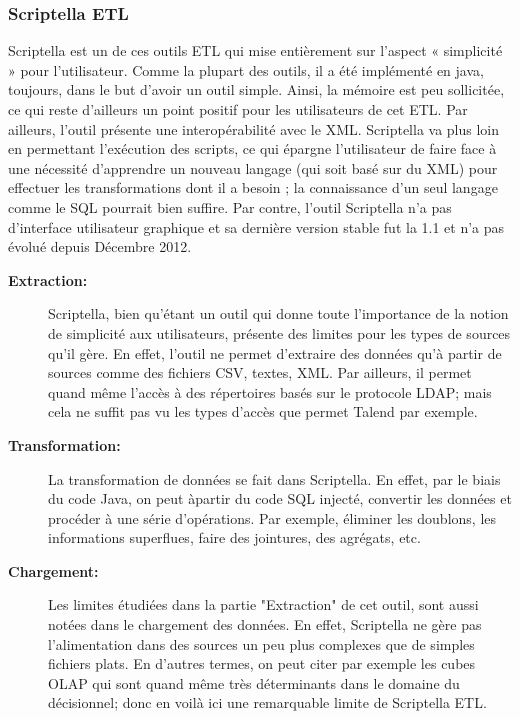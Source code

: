 \documentclass[12pt,a4wide,twoside]{report}
\begin{document}
\subsubsection{Scriptella ETL}
Scriptella est un de ces outils ETL qui mise entièrement sur l’aspect « simplicité » pour l’utilisateur. Comme la plupart des outils, il a été implémenté en java, toujours, dans le but d’avoir un outil simple. Ainsi, la mémoire est peu sollicitée, ce qui reste d’ailleurs un point positif pour les utilisateurs de cet ETL. Par ailleurs, l'outil présente une interopérabilité avec le XML. \newline
Scriptella va plus loin en permettant l’exécution des scripts, ce qui épargne l’utilisateur de faire face à une nécessité d’apprendre un nouveau langage (qui soit basé sur du XML) pour effectuer les transformations dont il a besoin ; la connaissance d’un seul langage comme le SQL pourrait bien suffire.\newline
Par contre, l’outil Scriptella n’a pas d’interface utilisateur graphique et sa dernière version stable fut la 1.1 et n’a pas évolué depuis Décembre 2012.
\begin{description}
	\item[\textbf{Extraction:}] 
		Scriptella, bien qu'étant un outil qui donne toute l'importance de la notion de simplicité aux utilisateurs, présente des limites pour les types de sources qu'il gère. En effet, l'outil ne permet d'extraire des données qu'à partir de sources comme des fichiers CSV, textes, XML. Par ailleurs, il permet quand même l'accès à des répertoires basés sur le protocole LDAP; mais cela ne suffit pas vu les types d'accès que permet Talend par exemple.
	\item[\textbf{Transformation:}] 
	La transformation de données se fait dans Scriptella. En effet, par le biais du code Java, on peut àpartir du code SQL injecté, convertir les données et procéder à une série d’opérations. Par exemple, éliminer les doublons, les informations superflues, faire des jointures, des agrégats, etc.

	\item[\textbf{Chargement:}]
	
		Les limites étudiées dans la partie "Extraction" de cet outil, sont aussi notées dans le chargement des données. En effet, Scriptella ne gère pas l'alimentation dans des sources un peu plus complexes que de simples fichiers plats. En d'autres termes, on peut citer par exemple les cubes OLAP qui sont quand même très déterminants dans le domaine du décisionnel; donc en voilà ici une remarquable limite de Scriptella ETL.
	
\end{description}
\end{document}
